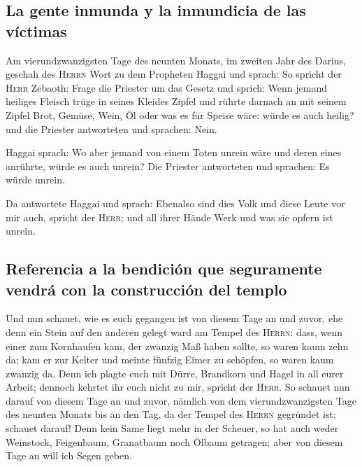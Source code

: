 \hypertarget{la-gente-inmunda-y-la-inmundicia-de-las-vuxedctimas}{%
\subsection{La gente inmunda y la inmundicia de las
víctimas}\label{la-gente-inmunda-y-la-inmundicia-de-las-vuxedctimas}}

 Am vierundzwanzigsten Tage des neunten Monats, im
zweiten Jahr des Darius, geschah des \textsc{Herrn} Wort zu dem
Propheten Haggai und sprach:  So spricht der
\textsc{Herr} Zebaoth: Frage die Priester um das Gesetz und sprich:
 Wenn jemand heiliges Fleisch trüge in seines Kleides
Zipfel und rührte darnach an mit seinem Zipfel Brot, Gemüse, Wein, Öl
oder was es für Speise wäre: würde es auch heilig? und die Priester
antworteten und sprachen: Nein.

 Haggai sprach: Wo aber jemand von einem Toten unrein
wäre und deren eines anrührte, würde es auch unrein? Die Priester
antworteten und sprachen: Es würde unrein.

 Da antwortete Haggai und sprach: Ebenalso sind dies Volk
und diese Leute vor mir auch, spricht der \textsc{Herr}; und all ihrer
Hände Werk und was sie opfern ist unrein.

\hypertarget{referencia-a-la-bendiciuxf3n-que-seguramente-vendruxe1-con-la-construcciuxf3n-del-templo}{%
\subsection{Referencia a la bendición que seguramente vendrá con la
construcción del
templo}\label{referencia-a-la-bendiciuxf3n-que-seguramente-vendruxe1-con-la-construcciuxf3n-del-templo}}

 Und nun schauet, wie es euch gegangen ist von diesem
Tage an und zuvor, ehe denn ein Stein auf den anderen gelegt ward am
Tempel des \textsc{Herrn}:  dass, wenn einer zum
Kornhaufen kam, der zwanzig Maß haben sollte, so waren kaum zehn da; kam
er zur Kelter und meinte fünfzig Eimer zu schöpfen, so waren kaum
zwanzig da.  Denn ich plagte euch mit Dürre, Brandkorn
und Hagel in all eurer Arbeit; dennoch kehrtet ihr euch nicht zu mir,
spricht der \textsc{Herr}.  So schauet nun darauf von
diesem Tage an und zuvor, nämlich von dem vierundzwanzigsten Tage des
neunten Monats bis an den Tag, da der Tempel des \textsc{Herrn}
gegründet ist; schauet darauf!  Denn kein Same liegt mehr
in der Scheuer, so hat auch weder Weinstock, Feigenbaum, Granatbaum noch
Ölbaum getragen; aber von diesem Tage an will ich Segen geben.


